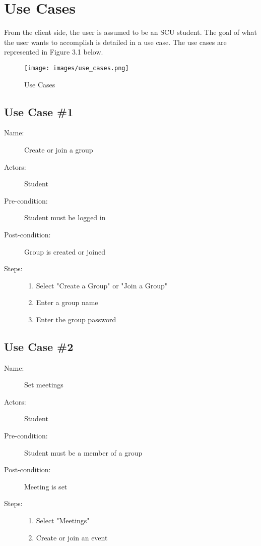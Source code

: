 \chapter{Use Cases}
From the client side, the user is assumed to be an SCU student. The goal of what the user wants to accomplish is detailed in a use case. The use cases are represented in Figure 3.1 below.

\begin{figure}[h]
	\centering
	\texttt{[image: images/use\_cases.png]}
	\caption{Use Cases}
	\label{fig:use cases}
\end{figure}

\section{Use Case \#1}
	\begin{description}
		\item[Name:] Create or join a group
		\item[Actors:] Student
		\item[Pre-condition:]
			Student must be logged in
		\item[Post-condition:]
			Group is created or joined
		\item[Steps:] \mbox{}
			\begin{enumerate}
				\item Select "Create a Group" or "Join a Group"
				\item Enter a group name
				\item Enter the group password
			\end{enumerate}	
	\end{description}

\section{Use Case \#2}
\begin{description}
	\item[Name:] Set meetings
	\item[Actors:] Student
	\item[Pre-condition:]
		Student must be a member of a group
	\item[Post-condition:]
		Meeting is set
	\item[Steps:] \mbox{}
	\begin{enumerate}
		\item Select "Meetings"
		\item Create or join an event
	\end{enumerate}	
\end{description}

